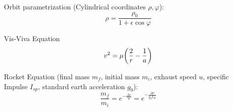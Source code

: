 			\noindent
			Orbit parametrization (Cylindrical coordinates $\rho, \varphi$):
			\begin{equation}
				\rho = \frac{\rho_0}{1+\epsilon \cos\varphi}
			\end{equation}

			\noindent
			Vis-Viva Equation
			\begin{equation}
				v^2 = \mu\qty(\frac{2}{r} - \frac{1}{a})
			\end{equation}

			\noindent
			Rocket Equation (final mass $m_f$, initial mass $m_i$, exhaust speed $u$, specific Impulse $I_{sp}$, standard earth acceleration $g_0$):
			\begin{equation}
				\frac{m_f}{m_i} = e^{-\frac{\Delta v}{u}} = e^{-\frac{\Delta v}{g_0 I_{sp}}}
			\end{equation}